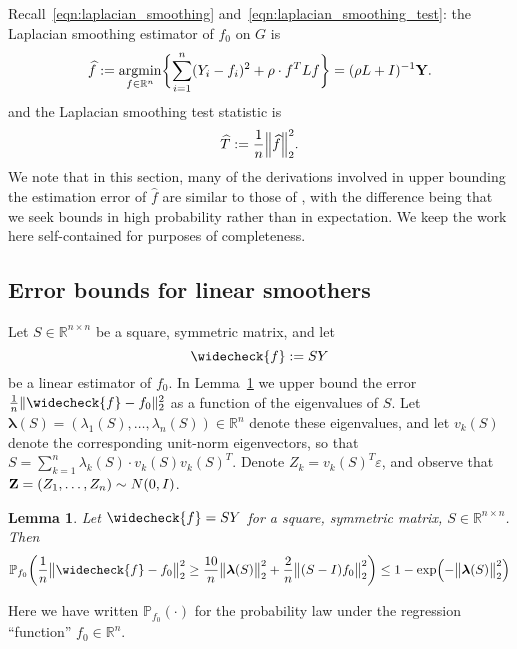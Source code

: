 \documentclass[twoside]{article}
\newcommand{\Reals}{\mathbb{R}}
\newcommand{\1}{\mathbf{1}}
\DeclareMathOperator*{\argmin}{argmin}
\newcommand{\lambdavec}{\boldsymbol{\lambda}}
\newcommand{\Lap}{L}
\newcommand{\Id}{I}
\newcommand{\Pbb}{\mathbb{P}}
\newcommand{\wh}[1]{\widehat{#1}}
\newcommand{\wc}[1]{\widecheck{#1}}
\newtheorem{lemma}{Lemma}
\theoremstyle{definition}
\theoremstyle{remark}
\begin{document}
Recall~\eqref{eqn:laplacian_smoothing} and~\eqref{eqn:laplacian_smoothing_test}: the Laplacian smoothing estimator of $f_0$ on $G$ is
\begin{equation*}
\label{eqn:ls_G}
\wh{f} := \argmin_{f \in \Reals^n} \biggl\{ \sum_{i = 1}^{n}(Y_i - f_i)^2 + \rho \cdot f^T \Lap f \biggr\} = (\rho \Lap + \Id)^{-1}{\bf Y}.
\end{equation*}
and the Laplacian smoothing test statistic is 
\begin{equation*}
\label{eqn:ls_ts_G}
\wh{T} := \frac{1}{n} \Bigl\|\wh{f}\Bigr\|_2^2.
\end{equation*}
We note that in this section, many of the derivations involved in upper bounding the estimation error of $\wh{f}$ are similar to those of \citep{sadhanala16}, with the difference being that we seek bounds in high probability rather than in expectation. We keep the work here self-contained for purposes of completeness.

\subsection{Error bounds for linear smoothers}
Let $S \in \Reals^{n \times n}$ be a square, symmetric matrix, and let 
\begin{equation*}
\wc{f} := SY
\end{equation*}
be a linear estimator of $f_0$. In  Lemma~\ref{lem:linear_smoother_fixed_graph_estimation} we upper bound the error $\frac{1}{n}\|\wc{f} - f_0\|_2^2$ as a function of the eigenvalues of $S$. Let $\lambdavec(S) = (\lambda_1(S),\ldots,\lambda_n(S)) \in \Reals^n$ denote these eigenvalues, and let $v_k(S)$ denote the corresponding unit-norm eigenvectors, so that $S = \sum_{k = 1}^{n} \lambda_k(S) \cdot v_k(S) v_k(S)^T$. Denote $Z_k = v_k(S)^T \varepsilon$, and observe that ${\bf Z} = (Z_1,\ldots,Z_n) \sim N(0,\Id)$. 

\begin{lemma}
	\label{lem:linear_smoother_fixed_graph_estimation}
	Let $\wc{f} = SY$ for a square, symmetric matrix, $S \in \Reals^{n \times n}$. Then
	\begin{equation*}
	\Pbb_{f_0}\biggl(\frac{1}{n}\bigl\|\wc{f} - f_0\bigr\|_2^2 \geq \frac{10}{n} \bigl\|\lambdavec(S)\bigr\|_2^2 + \frac{2}{n}\bigl\|(S - I)f_0\bigr\|_2^2\biggr) \leq 1 - \exp\Bigl(-\bigl\|\lambdavec(S)\bigr\|_2^2\Bigr)
	\end{equation*}
\end{lemma}
Here we have written $\Pbb_{f_0}(\cdot)$ for the probability law under the regression ``function'' $f_0 \in \Reals^n$. 
\end{document}
